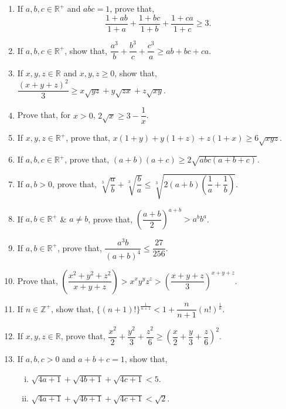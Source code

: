 \documentclass[11pt, a4paper]{article}
\begin{document}
\begin{enumerate}
	\item If $a, b, c \in \mathbb{R^+}$ and $abc = 1$, prove that, $$\dfrac{1+ab}{1+a} + \dfrac{1+bc}{1+b} + \dfrac{1+ca}{1+c} \geq 3.$$
	
	\item If $a, b, c \in \mathbb{R^+}$, show that, $\dfrac{a^3}{b} + \dfrac{b^3}{c} + \dfrac{c^3}{a} \geq ab+bc+ca$.
	
	\item If $x, y, z \in \mathbb{R}$ and $x, y, z \geq 0$, show that, $\dfrac{(x+y+z)^2}{3} \geq x\sqrt{yz} + y\sqrt{zx} + z\sqrt{xy}$.
	
	\item Prove that, for $x > 0$, $2\sqrt{x} \geq 3 - \dfrac{1}{x}$.
	
	\item If $x, y, z \in \mathbb{R^+}$, prove that, $x(1+y) + y(1+z) + z(1+x) \geq 6\sqrt{xyz}$.
	
	\item If $a, b, c \in \mathbb{R^+}$, prove that, $(a+b)(a+c) \geq 2\sqrt{abc(a+b+c)}$.
	
	\item If $a, b > 0$, prove that, $\sqrt[3]{\dfrac{a}{b}} + \sqrt[3]{\dfrac{b}{a}} \leq \sqrt[3]{2(a+b)\left( \dfrac{1}{a} + \dfrac{1}{b} \right)}$.
	
	\item If $a, b \in \mathbb{R^+}$ \& $a \neq b$, prove that, $\left( \dfrac{a+b}{2} \right)^{a+b} > a^b b^a$.
	
	\item If $a, b \in \mathbb{R^+}$, prove that, $\dfrac{a^3b}{(a+b)^4} \leq \dfrac{27}{256}$.
	
	\item Prove that, $\left( \dfrac{x^2 + y^2 + z^2}{x+y+z} \right) > x^x y^y z^z > \left( \dfrac{x+y+z}{3} \right)^{x+y+z}$.
	
	\item If $n \in \mathbb{Z^+}$, show that, $\{ (n+1)! \}^{\frac{1}{n+1}} < 1 + \dfrac{n}{n+1}(n!)^{\frac{1}{n}}$.
	
	\item If $x, y, z \in \mathbb{R}$, prove that, $\dfrac{x^2}{2} + \dfrac{y^2}{3} + \dfrac{z^2}{6} \geq \left( \dfrac{x}{2} + \dfrac{y}{3} + \dfrac{z}{6} \right)^2$.
	
	\item If $a, b, c > 0$ and $a+b+c = 1$, show that, 
	\begin{enumerate}[(i)]
		\item $\sqrt{4a+1} + \sqrt{4b+1} + \sqrt{4c+1} < 5$.
		\item $\sqrt{4a+1} + \sqrt{4b+1} + \sqrt{4c+1} < \sqrt{2}$.
	\end{enumerate}
		

\end{enumerate}
\end{document}
